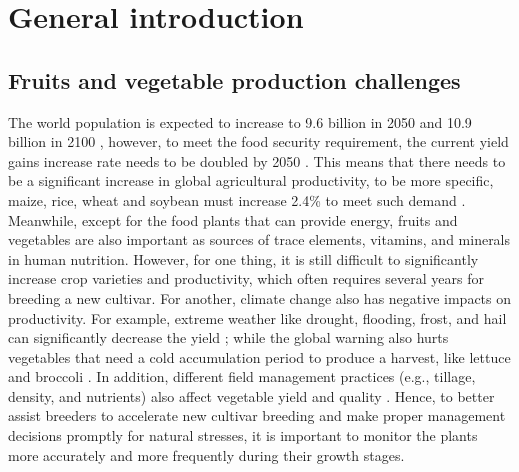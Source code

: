 \chapter{General introduction}

\section{Fruits and vegetable production challenges}


The world population is expected to increase to 9.6 billion in 2050 and 10.9 billion in 2100 \citep{gerland_world_2014}, however, to meet the food security requirement, the current yield gains increase rate needs to be doubled by 2050 \citep{tilman_global_2011, ray_yield_2013}. This means that there needs to be a significant increase in global agricultural productivity, to be more specific, maize, rice, wheat and soybean must increase 2.4\% to meet such demand \citep{ray_yield_2013}. Meanwhile, except for the food plants that can provide energy, fruits and vegetables are also important as sources of trace elements, vitamins, and minerals in human nutrition. However, for one thing, it is still difficult to significantly increase crop varieties and productivity, which often requires several years for breeding a new cultivar. For another, climate change also has negative impacts on productivity. For example, extreme weather like drought, flooding, frost, and hail can significantly decrease the yield \citep{lobell_influence_2012}; while the global warning also hurts vegetables that need a cold accumulation period to produce a harvest, like lettuce and broccoli \citep{bisbis_potential_2018}. In addition, different field management practices (e.g., tillage, density, and nutrients) also affect vegetable yield and quality \citep{jackson_onfarm_2004, satodiya_effect_2015}. Hence, to better assist breeders to accelerate new cultivar breeding and make proper management decisions promptly for natural stresses, it is important to monitor the plants more accurately and more frequently during their growth stages.

